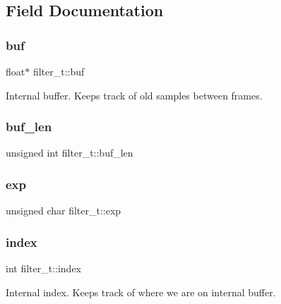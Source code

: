 \subsection{Field Documentation}
\mbox{\label{structfilter__t_a3567b5dd3dc06bcee781721b50565213}} 
\subsubsection{\texorpdfstring{buf}{buf}}
{\footnotesize\ttfamily float$\ast$ filter\+\_\+t\+::buf}



Internal buffer. Keeps track of old samples between frames. 

\mbox{\label{structfilter__t_a97a989230be5b2e10eecc3de6b2c7dbb}} 
\subsubsection{\texorpdfstring{buf\+\_\+len}{buf\_len}}
{\footnotesize\ttfamily unsigned int filter\+\_\+t\+::buf\+\_\+len}

\mbox{\label{structfilter__t_acf95f97baf83ef8bb108d8c9e51a0d8b}} 
\subsubsection{\texorpdfstring{exp}{exp}}
{\footnotesize\ttfamily unsigned char filter\+\_\+t\+::exp}

\mbox{\label{structfilter__t_a858cfd81f33da9ad7c085aec0bea5693}} 
\subsubsection{\texorpdfstring{index}{index}}
{\footnotesize\ttfamily int filter\+\_\+t\+::index}



Internal index. Keeps track of where we are on internal buffer. 

